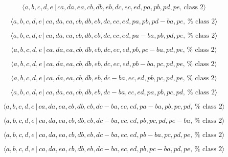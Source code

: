 \documentclass[10pt]{article}
\begin{document}
\begin{equation}
\langle a,b,c,d,e\,|\,ca,da,ea,cb,db,eb,dc,ec,ed,pa,pb,pd,pe,\,\text{class }%
2\rangle  \tag{7.4579}
\end{equation}

\begin{equation}
\langle a,b,c,d,e\,|\,ca,da,ea,cb,db,eb,dc,ec,ed,pa,pb,pd-ba,pe,\,\text{%
class }2\rangle  \tag{7.4580}
\end{equation}

\begin{equation}
\langle a,b,c,d,e\,|\,ca,da,ea,cb,db,eb,dc,ec,ed,pa-ba,pb,pd,pe,\,\text{%
class }2\rangle  \tag{7.4581}
\end{equation}

\begin{equation}
\langle a,b,c,d,e\,|\,ca,da,ea,cb,db,eb,dc,ec,ed,pb,pc-ba,pd,pe,\,\text{%
class }2\rangle  \tag{7.4582}
\end{equation}

\begin{equation}
\langle a,b,c,d,e\,|\,ca,da,ea,cb,db,eb,dc,ec,ed,pb-ba,pc,pd,pe,\,\text{%
class }2\rangle  \tag{7.4583}
\end{equation}

\begin{equation}
\langle a,b,c,d,e\,|\,ca,da,ea,cb,db,eb,dc-ba,ec,ed,pb,pc,pd,pe,\,\text{%
class }2\rangle  \tag{7.4584}
\end{equation}

\begin{equation}
\langle a,b,c,d,e\,|\,ca,da,ea,cb,db,eb,dc-ba,ec,ed,pa,pb,pc,pd,\,\text{%
class }2\rangle  \tag{7.4585}
\end{equation}

\begin{equation}
\langle a,b,c,d,e\,|\,ca,da,ea,cb,db,eb,dc-ba,ec,ed,pa-ba,pb,pc,pd,\,\text{%
class }2\rangle  \tag{7.4586}
\end{equation}

\begin{equation}
\langle a,b,c,d,e\,|\,ca,da,ea,cb,db,eb,dc-ba,ec,ed,pb,pc,pd,pe-ba,\,\text{%
class }2\rangle  \tag{7.4587}
\end{equation}

\begin{equation}
\langle a,b,c,d,e\,|\,ca,da,ea,cb,db,eb,dc-ba,ec,ed,pb-ba,pc,pd,pe,\,\text{%
class }2\rangle  \tag{7.4588}
\end{equation}

\begin{equation}
\langle a,b,c,d,e\,|\,ca,da,ea,cb,db,eb,dc-ba,ec,ed,pb,pc-ba,pd,pe,\,\text{%
class }2\rangle  \tag{7.4589}
\end{equation}
\end{document}
